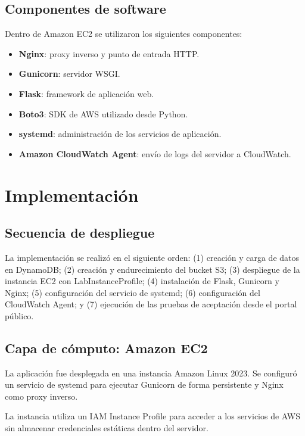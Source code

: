 \documentclass[11pt,letterpaper]{article}
\begin{document}
\subsection{Componentes de software}

Dentro de Amazon EC2 se utilizaron los siguientes componentes:

\begin{itemize}[leftmargin=*,itemsep=1.5pt,topsep=2pt]
    \item \textbf{Nginx}: proxy inverso y punto de entrada HTTP.
    \item \textbf{Gunicorn}: servidor WSGI.
    \item \textbf{Flask}: framework de aplicación web.
    \item \textbf{Boto3}: SDK de AWS utilizado desde Python.
    \item \textbf{systemd}: administración de los servicios de aplicación.
    \item \textbf{Amazon CloudWatch Agent}: envío de logs del servidor a CloudWatch.
\end{itemize}

\section{Implementación}

\subsection{Secuencia de despliegue}

La implementación se realizó en el siguiente orden: (1) creación y carga de datos en DynamoDB; (2) creación y endurecimiento del bucket S3; (3) despliegue de la instancia EC2 con LabInstanceProfile; (4) instalación de Flask, Gunicorn y Nginx; (5) configuración del servicio de systemd; (6) configuración del CloudWatch Agent; y (7) ejecución de las pruebas de aceptación desde el portal público.


\subsection{Capa de cómputo: Amazon EC2}

La aplicación fue desplegada en una instancia Amazon Linux 2023. Se configuró un servicio de systemd para ejecutar Gunicorn de forma persistente y Nginx como proxy inverso.

La instancia utiliza un IAM Instance Profile para acceder a los servicios de AWS sin almacenar credenciales estáticas dentro del servidor.
\end{document}
